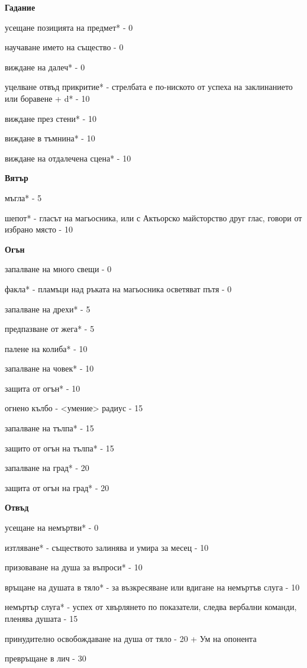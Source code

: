 \textbf{Гадание}
\begin{itemize*}
  \item{усещане позицията на предмет* - 0}
  \item{научаване името на същество - 0}
  \item{виждане на далеч* - 0}
  \item{уцелване отвъд прикритие* - стрелбата е по-ниското от успеха на заклинанието или боравене + d* - 10}
  \item{виждане през стени* - 10}
  \item{виждане в тъмнина* - 10}
  \item{виждане на отдалечена сцена* - 10}
\end{itemize*}


\textbf{Вятър}
\begin{itemize*}
  \item{мъгла* - 5}
  \item{шепот* - гласът на магьосника, или с Актьорско майсторство друг глас, говори от избрано място - 10}
\end{itemize*}


\textbf{Огън}
\begin{itemize*}
  \item{запалване на много свещи - 0}
  \item{факла* - пламъци над ръката на магьосника осветяват пътя - 0}
  \item{запалване на дрехи* - 5}
  \item{предпазване от жега* - 5}
  \item{палене на колиба* - 10}
  \item{запалване на човек* - 10}
  \item{защита от огън* - 10}
  \item{огнено кълбо - <умение> радиус - 15}
  \item{запалване на тълпа* - 15}
  \item{защито от огън на тълпа* - 15}
  \item{запалване на град* - 20}
  \item{защита от огън на град* - 20}
\end{itemize*}


\textbf{Отвъд}
\begin{itemize*}
  \item{усещане на немъртви* - 0}
  \item{изтляване* - съществото залинява и умира за месец - 10}
  \item{призоваване на душа за въпроси* - 10}
  \item{връщане на душата в тяло* - за възкресяване или вдигане на немъртъв слуга - 10}
  \item{немъртър слуга* - успех от хвърлянето по показатели, следва вербални команди, пленява душата - 15}
  \item{принудително освобождаване на душа от тяло - 20 + Ум на опонента}
  \item{превръщане в лич - 30}
\end{itemize*}


